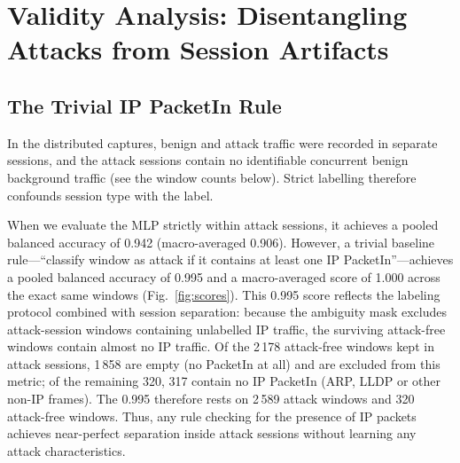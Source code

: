 \documentclass[journal]{IEEEtran}
\begin{document}



\section{Validity Analysis: Disentangling Attacks from Session Artifacts}\label{sec:confound}
\subsection{The Trivial IP PacketIn Rule}
In the distributed captures, benign and attack traffic were recorded in separate sessions, and the attack sessions contain no identifiable concurrent benign background traffic (see the window counts below). Strict labelling therefore confounds session type with the label.

When we evaluate the MLP strictly within attack sessions, it achieves a pooled balanced accuracy of 0.942 (macro-averaged 0.906). However, a trivial baseline rule---``classify window as attack if it contains at least one IP PacketIn''---achieves a pooled balanced accuracy of 0.995 and a macro-averaged score of 1.000 across the exact same windows (Fig.~\ref{fig:scores}). This 0.995 score reflects the labeling protocol combined with session separation: because the ambiguity mask excludes attack-session windows containing unlabelled IP traffic, the surviving attack-free windows contain almost no IP traffic. Of the 2\,178 attack-free windows kept in attack sessions, 1\,858 are empty (no PacketIn at all) and are excluded from this metric; of the remaining 320, 317 contain no IP PacketIn (ARP, LLDP or other non-IP frames). The 0.995 therefore rests on 2\,589 attack windows and 320 attack-free windows. Thus, any rule checking for the presence of IP packets achieves near-perfect separation inside attack sessions without learning any attack characteristics.
\end{document}
